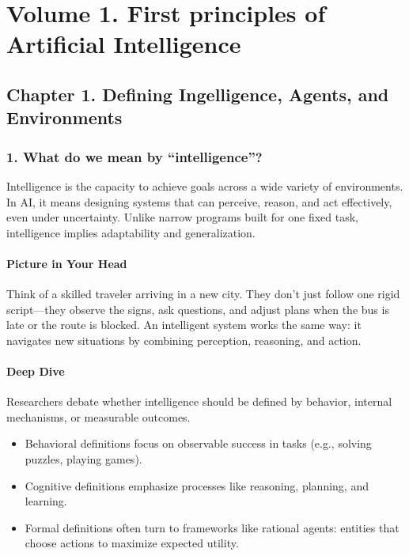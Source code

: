 \documentclass[
  letterpaper,
  DIV=11,
  numbers=noendperiod]{scrreprt}
\providecommand{\tightlist}{%
  \setlength{\itemsep}{0pt}\setlength{\parskip}{0pt}}
\begin{document}

\chapter{Volume 1. First principles of Artificial
Intelligence}\label{volume-1.-first-principles-of-artificial-intelligence}

\section{Chapter 1. Defining Ingelligence, Agents, and
Environments}\label{chapter-1.-defining-ingelligence-agents-and-environments}

\subsection{1. What do we mean by
``intelligence''?}\label{what-do-we-mean-by-intelligence}

Intelligence is the capacity to achieve goals across a wide variety of
environments. In AI, it means designing systems that can perceive,
reason, and act effectively, even under uncertainty. Unlike narrow
programs built for one fixed task, intelligence implies adaptability and
generalization.

\subsubsection{Picture in Your Head}\label{picture-in-your-head}

Think of a skilled traveler arriving in a new city. They don't just
follow one rigid script---they observe the signs, ask questions, and
adjust plans when the bus is late or the route is blocked. An
intelligent system works the same way: it navigates new situations by
combining perception, reasoning, and action.

\subsubsection{Deep Dive}\label{deep-dive}

Researchers debate whether intelligence should be defined by behavior,
internal mechanisms, or measurable outcomes.

\begin{itemize}
\tightlist
\item
  Behavioral definitions focus on observable success in tasks (e.g.,
  solving puzzles, playing games).
\item
  Cognitive definitions emphasize processes like reasoning, planning,
  and learning.
\item
  Formal definitions often turn to frameworks like rational agents:
  entities that choose actions to maximize expected utility.
\end{itemize}
\end{document}
